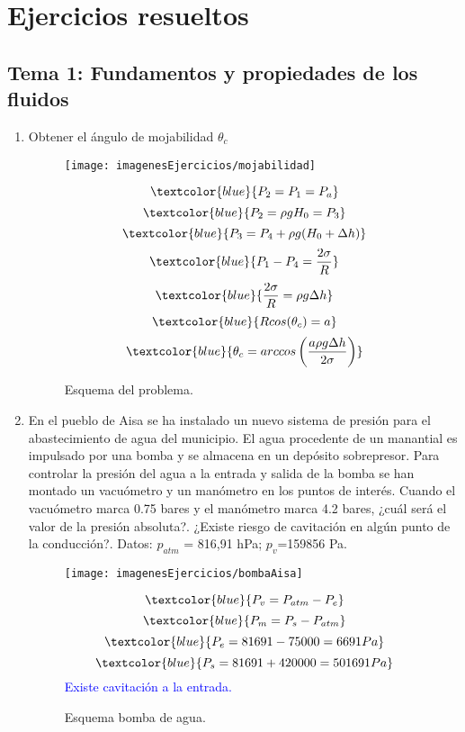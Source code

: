\section{Ejercicios resueltos}
\subsection{Tema 1: Fundamentos y propiedades de los fluidos}
\begin{enumerate}
	\item Obtener el ángulo de mojabilidad $\theta_c$ 
	\begin{figure}[H]
		\begin{minipage}{0.7\textwidth}
		\centering
		\texttt{[image: imagenesEjercicios/mojabilidad]}
		\caption{Esquema del problema.}
		\label{fig:mojabilidad}
	\end{minipage}%
	\begin{minipage}{0.3\textwidth}
	\[\textcolor{blue}{P_2=P_1=P_a}\]
	\[\textcolor{blue}{P_2=\rho g H_0=P_3}\]
	\[\textcolor{blue}{P_3=P_4+\rho g (H_0+\Delta h)}\]
	\[\textcolor{blue}{P_1-P_4=\frac{2\sigma}{R}}\]
	\[\textcolor{blue}{\frac{2\sigma}{R}=\rho g \Delta h}\]
	\[\textcolor{blue}{Rcos(\theta_c)=a}\]
	\[\textcolor{blue}{\theta_c=arccos\left(\frac{a\rho g \Delta h}{2\sigma}\right)}\]
	
	\end{minipage}
	\end{figure}
	
	\item En el pueblo de Aisa se ha instalado un nuevo sistema de presión para el abastecimiento
	de agua del municipio. El agua procedente de un manantial es impulsado por una bomba
	y se almacena en un depósito sobrepresor. Para controlar la presión del agua a la entrada
	y salida de la bomba se han montado un vacuómetro y un manómetro en los puntos de
	interés. Cuando el vacuómetro marca 0.75 bares y el manómetro marca 4.2 bares, ¿cuál
	será el valor de la presión absoluta?. ¿Existe riesgo de cavitación en algún punto de la
	conducción?. Datos: $p_{atm}$ = 816,91 hPa; $p_v$=159856 Pa.
	\begin{figure}[H]
		\begin{minipage}{0.7\textwidth}
		\centering
		\texttt{[image: imagenesEjercicios/bombaAisa]}
		\caption{Esquema bomba de agua.}
		\label{fig:bombaaisa}
	\end{minipage}%
	\begin{minipage}{0.3\textwidth}
	\[\textcolor{blue}{P_v=P_{atm}-P_e}\]
	\[\textcolor{blue}{P_m=P_s-P_{atm}}\]
\[ \textcolor{blue}{P_e=81691-75000=6691 Pa}\]
\[\textcolor{blue}{P_s=81691+420000=501691 Pa}\]
\textcolor{blue}{Existe cavitación a la entrada.}
	

\end{minipage}
\end{figure}
\end{enumerate}
